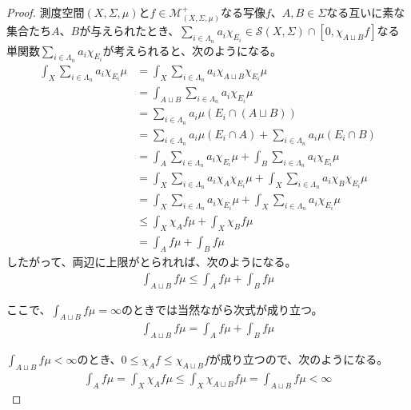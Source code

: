 \documentclass[dvipdfmx]{jsarticle}
\begin{document}
\begin{proof}
測度空間$(X,\varSigma,\mu)$と$f \in \mathcal{M}_{(X,\varSigma,\mu)}^{+}$なる写像$f$、$A,B \in \varSigma$なる互いに素な集合たち$A$、$B$が与えられたとき、$\sum_{i \in \varLambda_{n}} {a_{i}\chi_{E_{i}}}\in \mathcal{S}(X,\varSigma) \cap \left[ 0,\chi_{A \sqcup B}f \right]$なる単関数$\sum_{i \in \varLambda_{n}} {a_{i}\chi_{E_{i}}}$が考えられると、次のようになる。
\begin{align*}
\int_{X} {\sum_{i \in \varLambda_{n}} {a_{i}\chi_{E_{i}}}\mu} &= \int_{X} {\sum_{i \in \varLambda_{n}} {a_{i}\chi_{A \sqcup B}\chi_{E_{i}}}\mu}\\
&= \int_{A \sqcup B} {\sum_{i \in \varLambda_{n}} {a_{i}\chi_{E_{i}}}\mu}\\
&= \sum_{i \in \varLambda_{n}} {a_{i}\mu\left( E_{i} \cap (A \sqcup B) \right)}\\
&= \sum_{i \in \varLambda_{n}} {a_{i}\mu\left( E_{i} \cap A \right)} + \sum_{i \in \varLambda_{n}} {a_{i}\mu\left( E_{i} \cap B \right)}\\
&= \int_{A} {\sum_{i \in \varLambda_{n}} {a_{i}\chi_{E_{i}}}\mu} + \int_{B} {\sum_{i \in \varLambda_{n}} {a_{i}\chi_{E_{i}}}\mu}\\
&= \int_{X} {\sum_{i \in \varLambda_{n}} {a_{i}\chi_{A}\chi_{E_{i}}}\mu} + \int_{X} {\sum_{i \in \varLambda_{n}} {a_{i}\chi_{B}\chi_{E_{i}}}\mu}\\
&= \int_{X} {\sum_{i \in \varLambda_{n}} {a_{i}\chi_{E_{i}}}\mu} + \int_{X} {\sum_{i \in \varLambda_{n}} {a_{i}\chi_{E_{i}}}\mu}\\
&\leq \int_{X} {\chi_{A}f\mu} + \int_{X} {\chi_{B}f\mu}\\
&= \int_{A} {f\mu} + \int_{B} {f\mu}
\end{align*}
したがって、両辺に上限がとられれば、次のようになる。
\begin{align*}
\int_{A \sqcup B} {f\mu} \leq \int_{A} {f\mu} + \int_{B} {f\mu}
\end{align*}\par
ここで、$\int_{A \sqcup B} {f\mu} = \infty$のときでは当然ながら次式が成り立つ。
\begin{align*}
\int_{A \sqcup B} {f\mu} = \int_{A} {f\mu} + \int_{B} {f\mu}
\end{align*}\par
$\int_{A \sqcup B} {f\mu} < \infty$のとき、$0 \leq \chi_{A}f \leq \chi_{A \sqcup B}f$が成り立つので、次のようになる。
\begin{align*}
\int_{A} {f\mu} = \int_{X} {\chi_{A}f\mu} \leq \int_{X} {\chi_{A \sqcup B}f\mu} = \int_{A \sqcup B} {f\mu} < \infty

\end{align*}
\end{proof}
\end{document}
